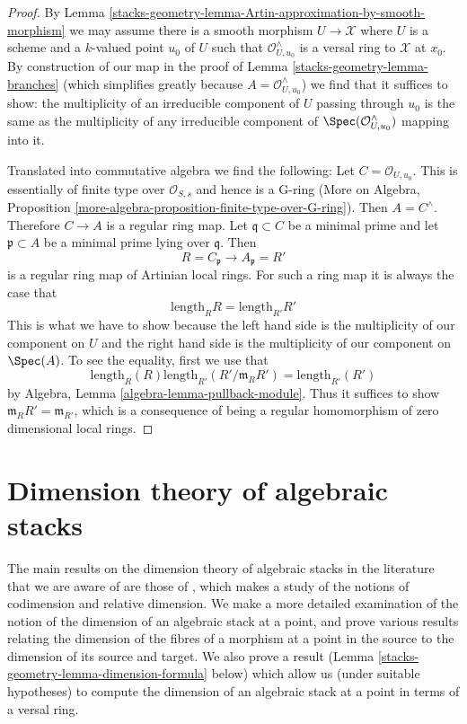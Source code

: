 \begin{proof}
By Lemma \ref{stacks-geometry-lemma-Artin-approximation-by-smooth-morphism} we
may assume there is a smooth morphism $U \to \mathcal{X}$
where $U$ is a scheme and a $k$-valued point $u_0$ of $U$
such that $\mathcal{O}_{U, u_0}^\wedge$ is a versal ring to
$\mathcal{X}$ at $x_0$. By construction of our map in
the proof of Lemma \ref{stacks-geometry-lemma-branches} (which simplifies
greatly because $A = \mathcal{O}_{U, u_0}^\wedge$) we find
that it suffices to show: the multiplicity of an irreducible
component of $U$ passing through $u_0$ is the same as the
multiplicity of any irreducible component of
$\Spec(\mathcal{O}_{U, u_0}^\wedge)$ mapping into it.

\medskip\noindent
Translated into commutative algebra we find the following:
Let $C = \mathcal{O}_{U, u_0}$. This is essentially of finite type
over $\mathcal{O}_{S, s}$ and hence is a G-ring (More on Algebra,
Proposition \ref{more-algebra-proposition-finite-type-over-G-ring}).
Then $A = C^\wedge$. Therefore $C \to A$ is a regular ring map.
Let $\mathfrak q \subset C$ be a minimal prime and let $\mathfrak p \subset A$
be a minimal prime lying over $\mathfrak q$. Then
$$
R = C_\mathfrak p \longrightarrow A_\mathfrak p = R'
$$
is a regular ring map of Artinian local rings. For such a ring map
it is always the case that
$$
\text{length}_R R = \text{length}_{R'} R'
$$
This is what we have to show because the left hand side
is the multiplicity of our component on $U$ and the right hand
side is the multiplicity of our component on $\Spec(A)$.
To see the equality, first we use that
$$
\text{length}_R(R) \text{length}_{R'}(R'/\mathfrak m_R R') =
\text{length}_{R'}(R')
$$
by Algebra, Lemma \ref{algebra-lemma-pullback-module}. Thus it suffices
to show $\mathfrak m_R R' = \mathfrak m_{R'}$, which is a consequence
of being a regular homomorphism of zero dimensional local rings.
\end{proof}

\section{Dimension theory of algebraic stacks}
\label{stacks-geometry-section-dimension-of-algebraic-stacks}
The main results on the dimension theory of algebraic stacks in the
literature that we are aware of are those of \cite{Osserman}, which
makes a study of the notions of codimension and relative dimension. We
make a more detailed examination of the notion of the dimension of an
algebraic stack at a point, and prove various results
relating the dimension of the fibres of a morphism at a point in the source
to the dimension of its source and target.  We also prove a result
(Lemma \ref{stacks-geometry-lemma-dimension-formula} below) which
allow us (under suitable hypotheses) to compute the dimension of
an algebraic stack at a point in terms of a versal ring.

